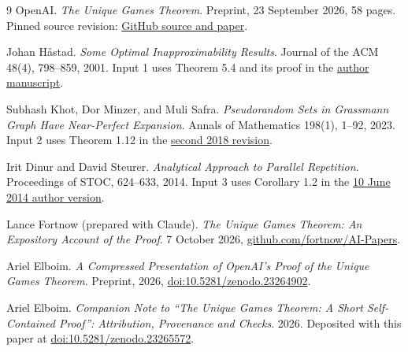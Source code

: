 \documentclass[11pt]{article}
\newcommand{\depositdoi}{10.5281/zenodo.23265572}
\begin{document}
{\small
\begin{thebibliography}{9}
OpenAI. \emph{The Unique Games Theorem}. Preprint, 23 September 2026,
58 pages. Pinned source revision:
\href{https://github.com/openai/math/tree/fd4aeeb2ee4fc729c18d98444fed42fd0529eeeb/preprints/The-Unique-Games-Theorem-September-23-2026}{GitHub source and paper}.

Johan H\aa stad. \emph{Some Optimal Inapproximability Results}.
Journal of the ACM 48(4), 798--859, 2001.
Input 1 uses Theorem 5.4 and its proof in the
\href{https://people.kth.se/~johanh/optimalinap.pdf}{author manuscript}.

Subhash Khot, Dor Minzer, and Muli Safra.
\emph{Pseudorandom Sets in Grassmann Graph Have Near-Perfect Expansion}.
Annals of Mathematics 198(1), 1--92, 2023.
Input 2 uses Theorem 1.12 in the
\href{https://eccc.weizmann.ac.il/report/2018/006/revision/2/download}{second 2018 revision}.

Irit Dinur and David Steurer. \emph{Analytical Approach to Parallel
Repetition}. Proceedings of STOC, 624--633, 2014.
Input 3 uses Corollary 1.2 in the
\href{https://www.dsteurer.org/paper/productgames.pdf}{10 June 2014 author version}.

Lance Fortnow (prepared with Claude). \emph{The Unique Games Theorem: An
Expository Account of the Proof}. 7 October 2026,
\href{https://github.com/fortnow/AI-Papers}{github.com/fortnow/AI-Papers}.

Ariel Elboim. \emph{A Compressed Presentation of OpenAI's Proof of the
Unique Games Theorem}. Preprint, 2026,
\href{https://doi.org/10.5281/zenodo.23264902}{doi:10.5281/zenodo.23264902}.

\raggedright{}
Ariel Elboim. \emph{Companion Note to ``The Unique Games Theorem: A Short
Self-Contained Proof'': Attribution, Provenance and Checks}. 2026.
Deposited with this paper at
\href{https://doi.org/\depositdoi}{doi:\depositdoi}.
\end{thebibliography}
}
\end{document}

